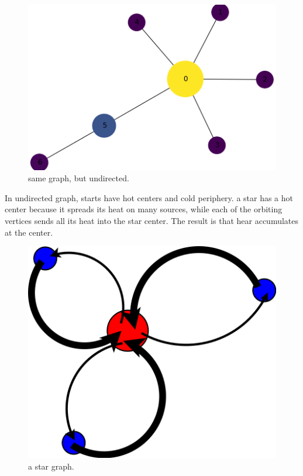 \begin{figure}[!htb]
\begin{framed}
  \centering
    \includegraphics[width=0.55\linewidth]{figures/undirected_graph_example.png}
  \caption{same graph, but undirected.}
  \label{fig:undirectedanked}
\end{framed}
\end{figure}

In undirected graph, starts have hot centers and cold periphery.
a star has a hot center because it spreads its heat on many sources,
while each of the orbiting vertices sends all its heat into the star center.
The result is that hear accumulates at the center.

\begin{figure}[!htb]
\begin{framed}
\centering
\includegraphics[width=0.55\linewidth]{figures/diagram_star.png}
\caption{a star graph.
}
\label{fig:hotstar}
\end{framed}
\end{figure}


